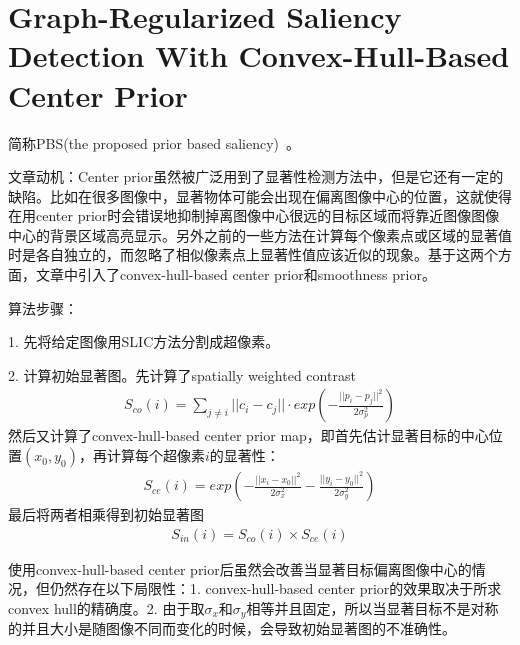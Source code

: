 \documentclass[12pt]{article}
\begin{document}
\section{Graph-Regularized Saliency Detection With Convex-Hull-Based Center Prior}

简称PBS(the proposed prior based saliency)~\cite{yang2013graph}。

文章动机：Center prior虽然被广泛用到了显著性检测方法中，但是它还有一定的缺陷。比如在很多图像中，显著物体可能会出现在偏离图像中心的位置，这就使得在用center prior时会错误地抑制掉离图像中心很远的目标区域而将靠近图像图像中心的背景区域高亮显示。另外之前的一些方法在计算每个像素点或区域的显著值时是各自独立的，而忽略了相似像素点上显著性值应该近似的现象。基于这两个方面，文章中引入了convex-hull-based center prior和smoothness prior。

算法步骤：

1. 先将给定图像用SLIC方法分割成超像素。

2. 计算初始显著图。先计算了spatially weighted contrast
\begin{align}
S_{co}(i) = \sum_{j \ne i}||c_i-c_j|| \cdot exp\left(-\frac{||p_i-p_j||^2}{2\sigma_p^2}\right)
\end{align}
然后又计算了convex-hull-based center prior map，即首先估计显著目标的中心位置$(x_0, y_0)$，再计算每个超像素$i$的显著性：
\begin{align}
S_{ce}(i) = exp\left(-\frac{||x_i-x_0||^2}{2\sigma_x^2}-\frac{||y_i-y_0||^2}{2\sigma_y^2}\right)
\end{align}
最后将两者相乘得到初始显著图
\begin{align}
S_{in}(i) = S_{co}(i) \times S_{ce}(i)
\end{align}

使用convex-hull-based center prior后虽然会改善当显著目标偏离图像中心的情况，但仍然存在以下局限性：1. convex-hull-based center prior的效果取决于所求convex hull的精确度。2. 由于取$\sigma_x$和$\sigma_y$相等并且固定，所以当显著目标不是对称的并且大小是随图像不同而变化的时候，会导致初始显著图的不准确性。
\end{document}

